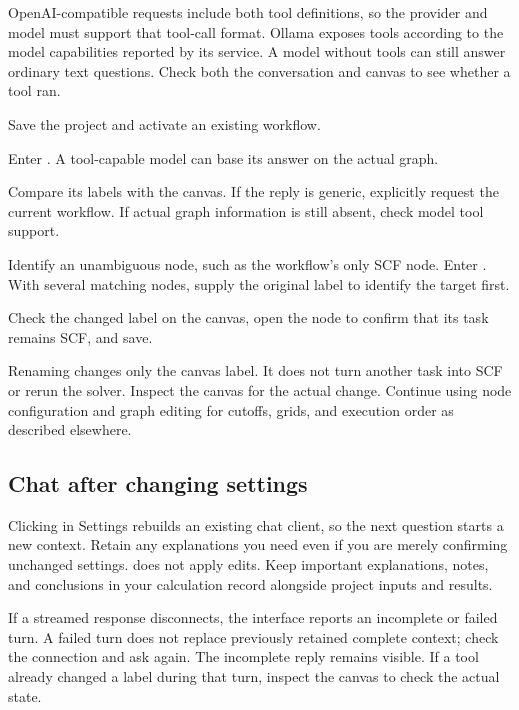 OpenAI-compatible requests include both tool definitions, so the provider and model must support that tool-call format. Ollama exposes tools according to the model capabilities reported by its service. A model without tools can still answer ordinary text questions. Check both the conversation and canvas to see whether a tool ran.

\begin{steps}
\item Save the project and activate an existing workflow.
\item Enter . A tool-capable model can base its answer on the actual graph.
\item Compare its labels with the canvas. If the reply is generic, explicitly request the current workflow. If actual graph information is still absent, check model tool support.
\item Identify an unambiguous node, such as the workflow's only SCF node. Enter . With several matching nodes, supply the original label to identify the target first.
\item Check the changed label on the canvas, open the node to confirm that its task remains SCF, and save.
\end{steps}

Renaming changes only the canvas label. It does not turn another task into SCF or rerun the solver. Inspect the canvas for the actual change. Continue using node configuration and graph editing for cutoffs, grids, and execution order as described elsewhere.

\subsection{Chat after changing settings}

Clicking  in Settings rebuilds an existing chat client, so the next question starts a new context. Retain any explanations you need even if you are merely confirming unchanged settings.  does not apply edits. Keep important explanations, notes, and conclusions in your calculation record alongside project inputs and results.

If a streamed response disconnects, the interface reports an incomplete or failed turn. A failed turn does not replace previously retained complete context; check the connection and ask again. The incomplete reply remains visible. If a tool already changed a label during that turn, inspect the canvas to check the actual state.

